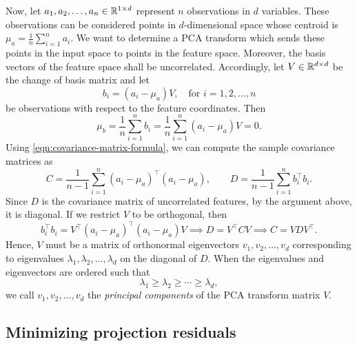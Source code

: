 Now, let \(a_1, a_2, \dots, a_n \in \mathbb{R}^{1 \times d}\) represent \(n\) observations in \(d\) variables.
These observations can be considered points in \(d\)-dimensional space whose centroid is \(\mu_a = \frac{1}{n} \sum_{i=1}^{n} a_i\).
We want to determine a PCA transform which sends these points in the input space to points in the feature space.
Moreover, the basis vectors of the feature space shall be uncorrelated.
Accordingly, let \(V \in \mathbb{R}^{d \times d}\) be the change of basis matrix and let
\begin{equation}
    \label{eqn:transformed-points}
    b_i = (a_i - \mu_a) V, \quad \text{for \(i = 1, 2, \dots, n\)}
\end{equation}
be observations with respect to the feature coordinates.
Then
\begin{equation}
    \mu_b
    = \frac{1}{n} \sum_{i=1}^{n} b_i
    = \frac{1}{n} \sum_{i=1}^{n} (a_i - \mu_a) V
    = 0.
\end{equation}
Using \cref{eqn:covariance-matrix-formula}, we can compute the sample covariance matrices as 
\begin{equation}
    C = \frac{1}{n-1} \sum_{i=1}^{n} (a_i - \mu_a)^\top (a_i - \mu_a),
    \qquad
    D = \frac{1}{n-1} \sum_{i=1}^{n} b_i^\top b_i.
\end{equation}
Since \(D\) is the covariance matrix of uncorrelated features, by the argument above, it is diagonal.
If we restrict \(V\) to be orthogonal, then
\begin{equation}
    b_i^\top b_i = V^\top (a_i - \mu_a)^\top (a_i - \mu_a) V
    \implies
    D = V^\top C V
    \implies
    C = V D V^\top.
\end{equation}
Hence, \(V\) must be a matrix of orthonormal eigenvectors \(v_1, v_2, \dots, v_d\) corresponding to eigenvalues \(\lambda_1, \lambda_2, \dots, \lambda_d\) on the diagonal of \(D\).
When the eigenvalues and eigenvectors are ordered such that
\begin{equation}
    \lambda_1 \geq \lambda_2 \geq \cdots \geq \lambda_d,
\end{equation}
we call \(v_1, v_2, \dots, v_d\) the \textit{principal components} of the PCA transform matrix \(V\).

\subsection{Minimizing projection residuals}

